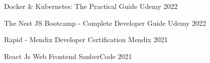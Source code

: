 

\begin{cvhonors}

  \cvhonor
    {Docker \& Kubernetes: The Practical Guide} %
    {Udemy} %
    {} %
    {2022} %

  \cvhonor
    {The Nest JS Bootcamp - Complete Developer Guide} %
    {Udemy} %
    {} %
    {2022} %

  \cvhonor
    {Rapid - Mendix Developer Certification} %
    {Mendix} %
    {} %
    {2021} %

  \cvhonor
    {React Js Web Frontend} %
    {SanberCode} %
    {} %
    {2021} %

\end{cvhonors}